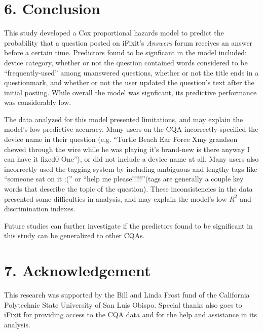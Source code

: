 \documentclass{article}
\begin{document}
\section*{6. Conclusion}

This study developed a Cox proportional hazards model to predict the probability that a question posted on iFixit's \textit{Answers} forum receives an answer before a certain time. Predictors found to be signficant in the model included: device category, whether or not the question contained words considered to be ``frequently-used'' among unanswered questions, whether or not the title ends in a questionmark, and whether or not the user updated the question's text after the initial posting. While overall the model was signficant, its predictive performance was considerably low. 

The data analyzed for this model presented limitations, and may explain the model's low predictive accuracy. Many users on the CQA incorrectly specified the device name in their question (e.g. ``Turtle Beach Ear Force Xmy grandson chewed through the wire while he was playing it's brand-new is there anyway I can have it fixed0 One''), or did not include a device name at all. Many users also incorrectly used the tagging system by including ambiguous and lengthy tags like ``someone sat on it :('' or ``help me please!!!!!''(tags are generally a couple key words that describe the topic of the question). These inconsistencies in the data presented some difficulties in analysis, and may explain the model's low $R^2$ and discrimination indexes. 

Future studies can further investigate if the predictors found to be significant in this study can be generalized to other CQAs. 




\section*{7. Acknowledgement}

This research was supported by the Bill and Linda Frost fund of the California Polytechnic State University of San Luis Obispo. Special thanks also goes to iFixit for providing access to the CQA data and for the help and assistance in its analysis. 


\end{document}
